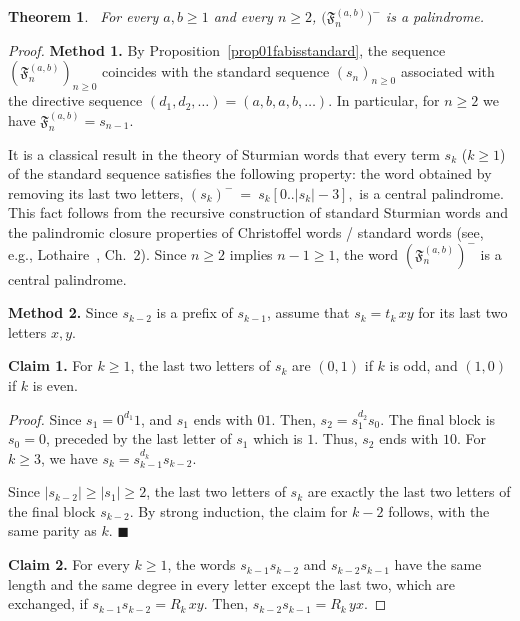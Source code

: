 \documentclass[12pt]{amsart}
\theoremstyle{plain}
\newtheorem{theorem}{Theorem}[section]
\theoremstyle{definition}
\theoremstyle{remark}
\newcommand{\FD}{\mathfrak{F}}
\renewcommand{\qedsymbol}{$\blacksquare$}
\begin{document}
\begin{theorem}~\label{thm01centralpalindrome}
For every $a,b\geqslant 1$ and every $n\geqslant 2$, $\bigl(\FD^{(a,b)}_n\bigr)^{-}$ is
a palindrome.
\end{theorem}
\begin{proof}
\noindent \textbf{Method 1.} 
By Proposition~\ref{prop01fabisstandard}, the sequence $(\FD^{(a,b)}_n)_{n\ge0}$ coincides with the standard sequence $(s_n)_{n\ge0}$ associated with the directive sequence $(d_1,d_2,\ldots)=(a,b,a,b,\ldots)$. In particular, for $n\ge 2$ we have $\FD^{(a,b)}_n=s_{n-1}$.

It is a classical result in the theory of Sturmian words that every term $s_k$ ($k\ge 1$) of the standard sequence satisfies the following property: the word obtained by removing its last two letters, $(s_k)^- \ = \ s_k[0..|s_k|-3],$
is a central palindrome. This fact follows from the recursive construction of standard Sturmian words and the palindromic closure properties of Christoffel words / standard words (see, e.g., Lothaire~\cite{Lothaire2002}, Ch.~2). Since $n\geqslant 2$ implies $n-1\geqslant  1$, the word $(\FD^{(a,b)}_n)^-$ is a central palindrome.

\medskip

\noindent \textbf{Method 2.}  Since $s_{k-2}$ is a prefix of $s_{k-1}$, assume that  $s_k = t_k\,xy$
for its last two letters $x,y$.

\medskip

\noindent \textbf{Claim 1.} For $k\geqslant 1$, the last two letters of $s_k$ are $(0,1)$ if $k$ is odd, and $(1,0)$ if $k$ is even.

\noindent \textit{Proof.} 
Since $s_1 = 0^{d_1}1$, and $s_1$ ends with $01$. Then, $s_2 = s_1^{d_2}s_0.$
The final block is $s_0=0$, preceded by the last letter of $s_1$ which is $1$. Thus, $s_2$ ends with $10$. For $k\geqslant 3$, we have $s_k = s_{k-1}^{d_k}s_{k-2}.$

Since $|s_{k-2}|\ge |s_1|\geqslant 2$, the last two letters of $s_k$ are exactly the last two letters of the final block $s_{k-2}$. By strong induction, the claim for $k-2$ follows, with the same parity as $k$. \hfill \qedsymbol

\medskip


\noindent \textbf{Claim 2.} For every $k\geqslant 1$, the words $s_{k-1}s_{k-2}$ and $s_{k-2}s_{k-1}$ have the same length and the same degree in every letter except the last two, which are exchanged, if $s_{k-1}s_{k-2}=R_k\,xy$. Then, $s_{k-2}s_{k-1}=R_k\,yx.$


\end{proof}
\end{document}
